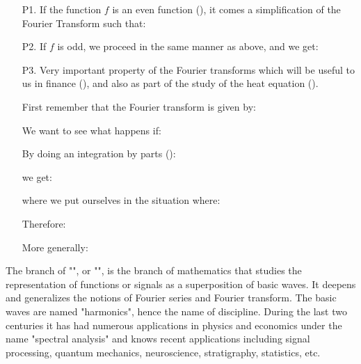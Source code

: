 	\begin{enumerate}
		\item[P1.] If the function $f$ is an even function (), it comes a simplification of the Fourier Transform such that:
		
		
		\item[P2.] If $f$ is odd, we proceed in the same manner as above, and we get:
		
		
		\item[P3.] Very important property of the Fourier transforms which will be useful to us in finance (), and also as part of the study of the heat equation ().
		
		First remember that the Fourier transform is given by:
		
		We want to see what happens if:
		
		By doing an integration by parts ():
		
		we get:
		
		where we put ourselves in the situation where:
		
		Therefore:
		
		More generally:
		
	\end{enumerate}
	\begin{tcolorbox}[title=Remark,colframe=black,arc=10pt]
	The branch of "", or "", is the branch of mathematics that studies the representation of functions or signals as a superposition of basic waves. It deepens and generalizes the notions of Fourier series and Fourier transform. The basic waves are named "harmonics", hence the name of discipline. During the last two centuries it has had numerous applications in physics and economics under the name "spectral analysis" and knows recent applications including signal processing, quantum mechanics, neuroscience, stratigraphy, statistics, etc.
	\end{tcolorbox}
